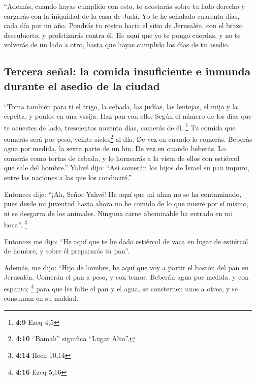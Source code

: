  ``Además, cuando hayas cumplido con esto, te acostarás
sobre tu lado derecho y cargarás con la iniquidad de la casa de Judá. Yo
te he señalado cuarenta días, cada día por un año. 
Pondrás tu rostro hacia el sitio de Jerusalén, con el brazo descubierto,
y profetizarás contra él.  He aquí que yo te pongo
cuerdas, y no te volverás de un lado a otro, hasta que hayas cumplido
los días de tu asedio.

\hypertarget{tercera-seuxf1al-la-comida-insuficiente-e-inmunda-durante-el-asedio-de-la-ciudad}{%
\subsection{Tercera señal: la comida insuficiente e inmunda durante el
asedio de la
ciudad}\label{tercera-seuxf1al-la-comida-insuficiente-e-inmunda-durante-el-asedio-de-la-ciudad}}

 ``Toma también para ti el trigo, la cebada, las judías,
las lentejas, el mijo y la espelta, y ponlos en una vasija. Haz pan con
ello. Según el número de los días que te acuestes de lado, trescientos
noventa días, comerás de él. \footnote{\textbf{4:9} Ezeq 4,5}
 Tu comida que comerás será por peso, veinte
siclos\footnote{\textbf{4:10} ``Bamah'' significa ``Lugar Alto''.} al
día. De vez en cuando lo comerás.  Beberás agua por
medida, la sexta parte de un hin. De vez en cuando beberás.
 Lo comerás como tortas de cebada, y lo hornearás a la
vista de ellos con estiércol que sale del hombre.'' 
Yahvé dijo: ``Así comerán los hijos de Israel su pan impuro, entre las
naciones a las que los conduciré.''

 Entonces dije: ``¡Ah, Señor Yahvé! He aquí que mi alma
no se ha contaminado, pues desde mi juventud hasta ahora no he comido de
lo que muere por sí mismo, ni se desgarra de los animales. Ninguna carne
abominable ha entrado en mi boca''. \footnote{\textbf{4:14} Hech 10,14}

 Entonces me dijo: ``He aquí que te he dado estiércol de
vaca en lugar de estiércol de hombre, y sobre él prepararás tu pan''.

 Además, me dijo: ``Hijo de hombre, he aquí que voy a
partir el bastón del pan en Jerusalén. Comerán el pan a peso, y con
temor. Beberán agua por medida, y con espanto; \footnote{\textbf{4:16}
  Ezeq 5,16}  para que les falte el pan y el agua, se
consternen unos a otros, y se consuman en su maldad.

